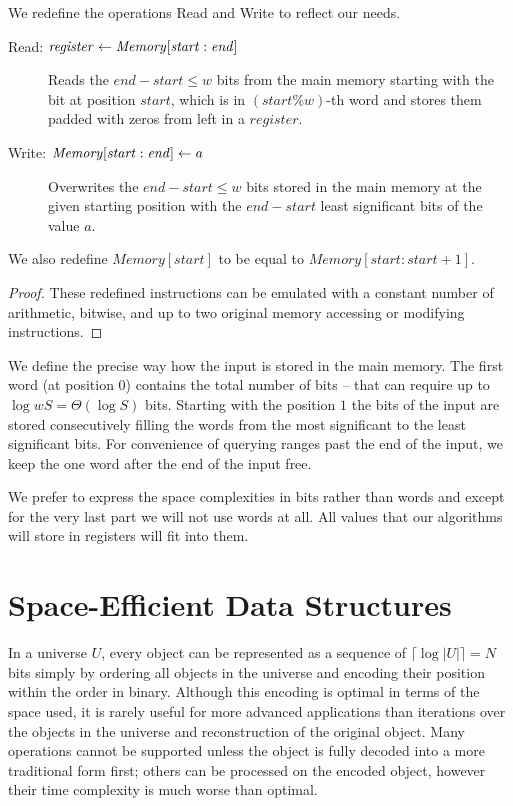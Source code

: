 \begin{lemma}
	We redefine the operations Read and Write to reflect our needs.
	
	\begin{description}
		\item[Read: $\mathit{register} \gets \mathit{Memory}[\mathit{start}:\mathit{end}\char93$]
		Reads the $\mathit{end} - \mathit{start} \le w$ bits from the main memory starting with the bit at position $\mathit{start}$, which is in $(\mathit{start} \% w)$-th word and stores them padded with zeros from left in a $register$.
		\item[Write: $\mathit{Memory}[\mathit{start}:\mathit{end}\char93 \gets a$]
		Overwrites the $\mathit{end} - \mathit{start} \le w$ bits stored in the main memory at the given starting position with the $\mathit{end} - \mathit{start}$ least significant bits of the value $a$.
	\end{description}
	
	We also redefine $\mathit{Memory}[\mathit{start}]$ to be equal to $\mathit{Memory}[\mathit{start}:\mathit{start} + 1]$.
\end{lemma}
\begin{proof}
	These redefined instructions can be emulated with a constant number of arithmetic, bitwise, and up to two original memory accessing or modifying instructions.
\end{proof}

We define the precise way how the input is stored in the main memory.
The first word (at position $0$) contains the total number of bits -- that can require up to $\log w S = \Theta(\log S)$ bits.
Starting with the position $1$ the bits of the input are stored consecutively filling the words from the most significant to the least significant bits.
For convenience of querying ranges past the end of the input, we keep the one word after the end of the input free.

We prefer to express the space complexities in bits rather than words and except for the very last part we will not use words at all.
All values that our algorithms will store in registers will fit into them.

\section{Space-Efficient Data Structures}

In a universe $U$, every object can be represented as a sequence of $\lceil \log |U| \rceil = N$ bits simply by ordering all objects in the universe and encoding their position within the order in binary.
Although this encoding is optimal in terms of the space used, it is rarely useful for more advanced applications than iterations over the objects in the universe and reconstruction of the original object.
Many operations cannot be supported unless the object is fully decoded into a more traditional form first; others can be processed on the encoded object, however their time complexity is much worse than optimal.


